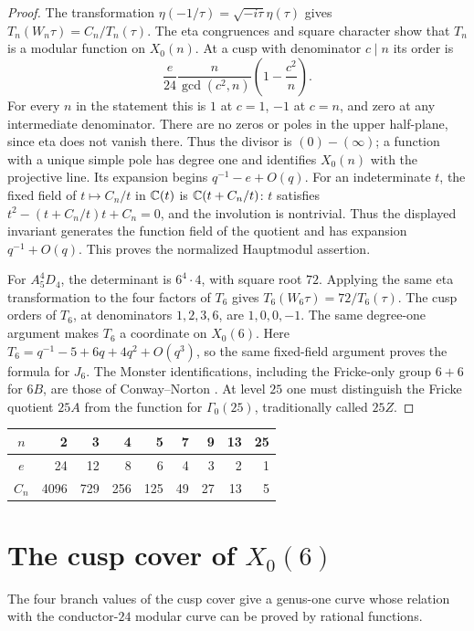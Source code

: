 \begin{proof}
The transformation \(\eta(-1/\tau)=\sqrt{-i\tau}\eta(\tau)\)
gives \(T_n(W_n\tau)=C_n/T_n(\tau)\).
The eta congruences and square character show that \(T_n\) is a
modular function on \(X_0(n)\). At a cusp with denominator \(c\mid n\)
its order is
\[
 \frac{e}{24}\frac{n}{\gcd(c^2,n)}
                   \left(1-\frac{c^2}{n}\right).
\]
For every \(n\) in the statement this is \(1\) at \(c=1\),
\(-1\) at \(c=n\), and zero at any intermediate denominator.
There are no zeros or poles in the upper half-plane, since eta
does not vanish there. Thus the divisor is \((0)-(\infty)\);
a function with a unique simple pole has degree one and identifies
\(X_0(n)\) with the projective line. Its expansion begins
\(q^{-1}-e+O(q)\).
For an indeterminate \(t\), the fixed field of
\(t\mapsto C_n/t\) in \(\mathbb C(t)\) is \(\mathbb C(t+C_n/t)\):
\(t\) satisfies \(t^2-(t+C_n/t)t+C_n=0\), and the
involution is nontrivial. Thus the displayed invariant generates
the function field of the quotient and has expansion \(q^{-1}+O(q)\).
This proves the normalized Hauptmodul assertion.

For \(A_5^4D_4\), the determinant is \(6^4\cdot4\), with square root
\(72\). Applying the same eta transformation to the four factors
of \(T_6\) gives \(T_6(W_6\tau)=72/T_6(\tau)\).
The cusp orders of \(T_6\), at denominators \(1,2,3,6\), are
\(1,0,0,-1\). The same degree-one argument makes \(T_6\) a
coordinate on \(X_0(6)\).
Here \(T_6=q^{-1}-5+6q+4q^2+O(q^3)\), so the same fixed-field
argument proves the formula for \(J_6\).
The Monster identifications, including the Fricke-only group \(6+6\)
for \(6B\), are those of Conway--Norton
\cite[Table~2, pp.~327--328]{CN1979}.
At level \(25\) one must distinguish the Fricke quotient \(25A\)
from the function for \(\Gamma_0(25)\), traditionally called \(25Z\).
\end{proof}

\begin{center}
\begin{tabular}{c|rrrrrrrr}
\(n\)&2&3&4&5&7&9&13&25\\ \hline
\(e\)&24&12&8&6&4&3&2&1\\
\(C_n\)&4096&729&256&125&49&27&13&5
\end{tabular}
\end{center}

\section{The cusp cover of \(X_0(6)\)}
The four branch values of the cusp cover give a genus-one curve
whose relation with the conductor-\(24\) modular curve can be proved
by rational functions.

